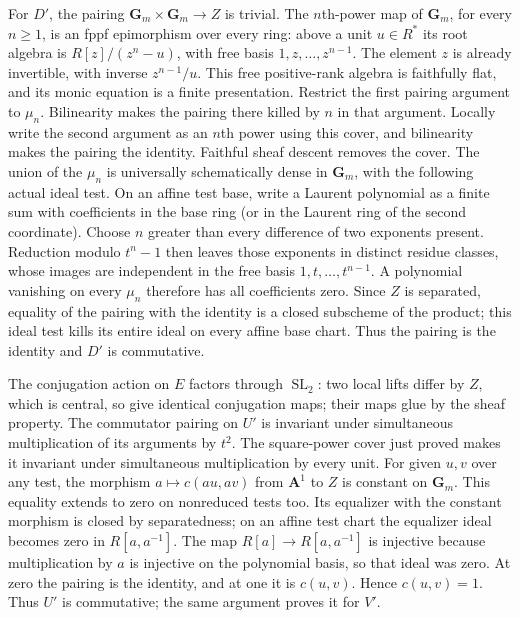 \documentclass[11pt,a4paper,openany]{report}
\begin{document}
For \(D'\), the pairing \(\mathbf G_m\times\mathbf G_m\to Z\) is trivial. The \(n\)th-power map of \(\mathbf G_m\), for every \(n\geq1\), is an fppf epimorphism over every ring: above a unit \(u\in R^*\) its root algebra is \(R[z]/(z^n-u)\), with free basis \(1,z,\ldots,z^{n-1}\). The element \(z\) is already invertible, with inverse \(z^{n-1}/u\). This free positive-rank algebra is faithfully flat, and its monic equation is a finite presentation. Restrict the first pairing argument to \(\mu_n\). Bilinearity makes the pairing there killed by \(n\) in that argument. Locally write the second argument as an \(n\)th power using this cover, and bilinearity makes the pairing the identity. Faithful sheaf descent removes the cover. The union of the \(\mu_n\) is universally schematically dense in \(\mathbf G_m\), with the following actual ideal test. On an affine test base, write a Laurent polynomial as a finite sum with coefficients in the base ring (or in the Laurent ring of the second coordinate). Choose \(n\) greater than every difference of two exponents present. Reduction modulo \(t^n-1\) then leaves those exponents in distinct residue classes, whose images are independent in the free basis \(1,t,\ldots,t^{n-1}\). A polynomial vanishing on every \(\mu_n\) therefore has all coefficients zero. Since \(Z\) is separated, equality of the pairing with the identity is a closed subscheme of the product; this ideal test kills its entire ideal on every affine base chart. Thus the pairing is the identity and \(D'\) is commutative.

The conjugation action on \(E\) factors through \(\operatorname{SL}_2\): two local lifts differ by \(Z\), which is central, so give identical conjugation maps; their maps glue by the sheaf property. The commutator pairing on \(U'\) is invariant under simultaneous multiplication of its arguments by \(t^2\). The square-power cover just proved makes it invariant under simultaneous multiplication by every unit. For given \(u,v\) over any test, the morphism \(a\mapsto c(au,av)\) from \(\mathbf A^1\) to \(Z\) is constant on \(\mathbf G_m\). This equality extends to zero on nonreduced tests too. Its equalizer with the constant morphism is closed by separatedness; on an affine test chart the equalizer ideal becomes zero in \(R[a,a^{-1}]\). The map \(R[a]\to R[a,a^{-1}]\) is injective because multiplication by \(a\) is injective on the polynomial basis, so that ideal was zero. At zero the pairing is the identity, and at one it is \(c(u,v)\). Hence \(c(u,v)=1\). Thus \(U'\) is commutative; the same argument proves it for \(V'\).
\end{document}
